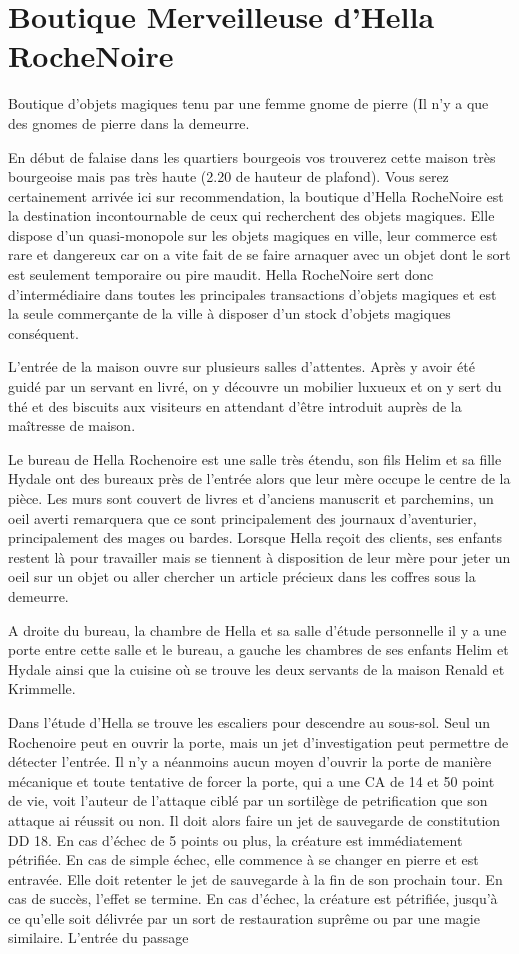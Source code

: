 \section{Boutique Merveilleuse d'Hella RocheNoire}

Boutique d'objets magiques tenu par une femme gnome de pierre
(Il n'y a que des gnomes de pierre dans la demeurre.

En début de falaise dans les quartiers bourgeois vos trouverez cette
maison très bourgeoise mais pas très haute (2.20 de hauteur de plafond).
Vous serez certainement arrivée ici sur recommendation, la boutique 
d'Hella RocheNoire est la destination incontournable de ceux qui 
recherchent des objets magiques. Elle dispose d'un quasi-monopole sur
les objets magiques en ville, leur commerce est rare et dangereux car
on a vite fait de se faire arnaquer avec un objet dont le sort est 
seulement temporaire ou pire maudit. Hella RocheNoire sert donc 
d'intermédiaire dans toutes les principales transactions d'objets
magiques et est la seule commerçante de la ville à disposer d'un stock
d'objets magiques conséquent.

L'entrée de la maison ouvre sur plusieurs salles d'attentes. Après y avoir
été guidé par un servant en livré, on y découvre un mobilier luxueux et on 
y sert du thé et des biscuits aux visiteurs en attendant d'être introduit
auprès de la maîtresse de maison.

Le bureau de Hella Rochenoire est une salle très étendu, son fils Helim 
et sa fille Hydale ont des bureaux près de l'entrée alors que leur mère 
occupe le centre de la pièce. Les murs sont couvert de livres et d'anciens 
manuscrit et parchemins, un oeil averti remarquera que ce sont principalement 
des journaux d'aventurier, principalement des mages ou bardes. Lorsque Hella 
reçoit des clients, ses enfants restent là pour travailler mais se tiennent 
à disposition de leur mère pour jeter un oeil sur un objet ou aller chercher 
un article précieux dans les coffres sous la demeurre.

A droite du bureau, la chambre de Hella et sa salle d'étude personnelle
il y a une porte entre cette salle et le bureau, a gauche les chambres
de ses enfants Helim et Hydale ainsi que la cuisine où se trouve les deux
servants de la maison Renald et Krimmelle.

Dans l'étude d'Hella se trouve les escaliers pour descendre au sous-sol.
Seul un Rochenoire peut en ouvrir la porte, mais un jet d'investigation
peut permettre de détecter l'entrée. Il n'y a néanmoins aucun moyen 
d'ouvrir la porte de manière mécanique et toute tentative de forcer la 
porte, qui a une CA de 14 et 50 point de vie, voit l'auteur de l'attaque 
ciblé par un sortilège de petrification que son attaque ai réussit ou non. Il doit 
alors faire un jet de sauvegarde de constitution DD 18. En cas d'échec de 5 points ou 
plus, la créature est immédiatement pétrifiée. En cas de simple échec, 
elle commence à se changer en pierre et est entravée. Elle doit retenter 
le jet de sauvegarde à la fin de son prochain tour. En cas de succès, 
l'effet se termine. En cas d'échec, la créature est pétrifiée, jusqu'à 
ce qu'elle soit délivrée par un sort de restauration suprême ou par une 
magie similaire. L'entrée du passage 

